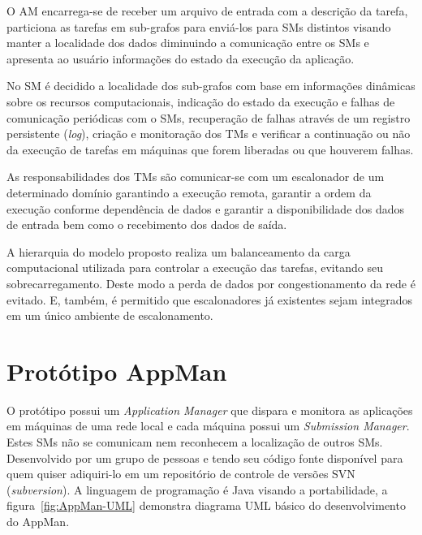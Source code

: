 O AM encarrega-se de receber um arquivo de entrada com a descrição da tarefa, particiona as tarefas em sub-grafos para enviá-los para SMs distintos visando manter a localidade dos dados diminuindo a comunicação entre os SMs e apresenta ao usuário informações do estado da execução da aplicação.

No SM é decidido a localidade dos sub-grafos com base em informações dinâmicas sobre os recursos computacionais, indicação do estado da execução e falhas de comunicação periódicas com o SMs, recuperação de falhas através de um registro persistente (\emph{log}), criação e monitoração dos TMs e verificar a continuação ou não da execução de tarefas em máquinas que forem liberadas ou que houverem falhas.

As responsabilidades dos TMs são comunicar-se com um escalonador de um determinado domínio garantindo a execução remota, garantir a ordem da execução conforme dependência de dados e garantir a disponibilidade dos dados de entrada bem como o recebimento dos dados de saída.

A hierarquia do modelo proposto realiza um balanceamento da carga computacional utilizada para controlar a execução das tarefas, evitando seu sobrecarregamento. Deste modo a perda de dados por congestionamento da rede é evitado. E, também, é permitido que escalonadores já existentes sejam integrados em um único ambiente de escalonamento.

\section{Protótipo AppMan}

O protótipo possui um \emph{Application Manager} que dispara e monitora as aplicações em máquinas de uma rede local e cada máquina possui um \emph{Submission Manager}. Estes SMs não se comunicam nem reconhecem a localização de outros SMs. Desenvolvido por um grupo de pessoas e tendo seu código fonte disponível para quem quiser adiquiri-lo em um repositório de controle de versões SVN (\emph{subversion}). A linguagem de programação é Java visando a portabilidade, a figura~\ref{fig:AppMan-UML} demonstra diagrama UML básico do desenvolvimento do AppMan.


